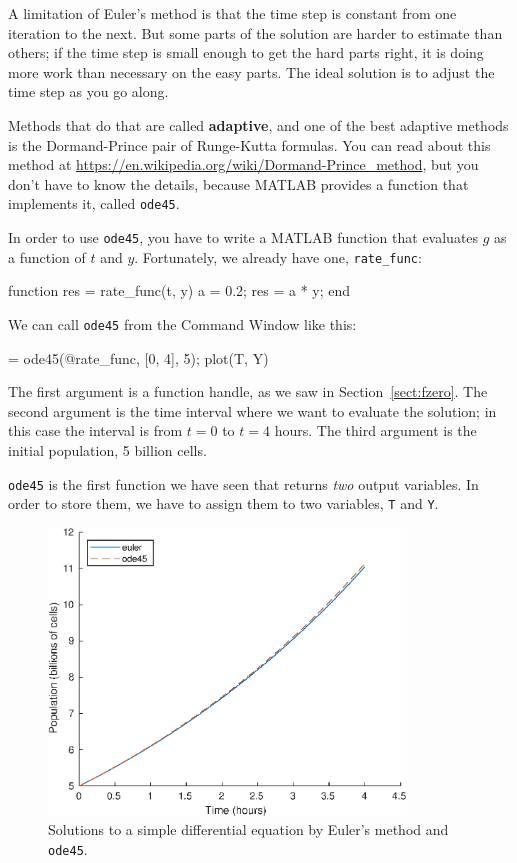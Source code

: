 \documentclass[
]{book}
\numberwithin{Answer}{chapter}
\numberwithin{Exercise}{chapter}
\begin{document}
A limitation of Euler's method is that the time step is constant from
one iteration to the next.  But some parts of the solution are
harder to estimate than others; if the time step is small enough to
get the hard parts right, it is doing more work than necessary on the
easy parts.  The ideal solution is to adjust the time step as you go
along.  

Methods that do that are called {\bf adaptive}, and one of the
best adaptive methods is the Dormand-Prince pair of Runge-Kutta
formulas.  
You can read about this method at \url{https://en.wikipedia.org/wiki/Dormand-Prince_method}, but you don't have to know the details, because MATLAB provides a function that implements it, called {\tt ode45}.

In order to use {\tt ode45}, you have to write a MATLAB function that evaluates $g$ as a function of $t$ and $y$.  Fortunately, we already have one, \verb"rate_func":

\begin{code}
function res = rate_func(t, y)
   a = 0.2;
   res = a * y;
end
\end{code}

We can call {\tt ode45} from the {\sf Command Window} like this:

\begin{code}
[T, Y] = ode45(@rate_func, [0, 4], 5);
plot(T, Y)
\end{code}

The first argument is a function handle, as we saw in Section~\ref{sect:fzero}.  The second argument is the time interval where we want to evaluate the solution; in this case the interval is from $t=0$ to $t=4$ hours.  The third argument is the initial population, 5 billion cells.

{\tt ode45} is the first function we have seen that returns {\em two} output variables.  In order to store them, we have to assign them to two variables, {\tt T} and {\tt Y}.

\begin{figure}
\centerline{\includegraphics[height=3in]{figs/runge.eps}}
\caption{Solutions to a simple differential equation by Euler's method and {\tt ode45}.}
\label{fig:runge}
\end{figure}
\end{document}
